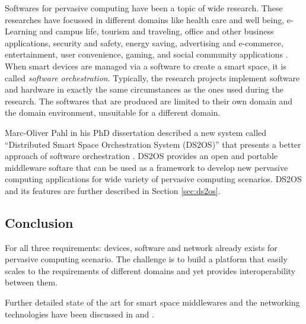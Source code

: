 Softwares for pervasive computing have been a topic of wide research. These researches have focussed in different domains like health care and well being, e-Learning and campus life, tourism and traveling, office and other business applications, security and safety, energy saving, advertising and e-commerce, entertainment, user convenience, gaming, and social community applications \cite{pahl2014distributed}. When smart devices are managed via a software to create a smart space, it is called \emph{software orchestration}. Typically, the research projects implement software and hardware in exactly the same circumstances as the ones used during the research. The softwares that are produced are limited to their own domain and the domain environment, unsuitable for a different domain.

Marc-Oliver Pahl in his PhD dissertation described a new system called ``Distributed Smart Space Orchestration System (DS2OS)'' that presents a better approach of software orchestration \cite{pahl2014distributed}. DS2OS provides an open and portable middleware softare that can be used as a framework to develop new pervasive computing applications for wide variety of pervasive computing scenarios. DS2OS and its features are further described in Section \ref{sec:ds2os}.

\subsection*{Conclusion}

For all three requirements: devices, software and network already exists for pervasive computing scenario. The challenge is to build a platform that easily scales to the requirements of different domains and yet provides interoperability between them.

Further detailed state of the art for smart space middlewares and the networking technologies have been discussed in \cite{warriach2013state} and \cite{pahl2014distributed}.